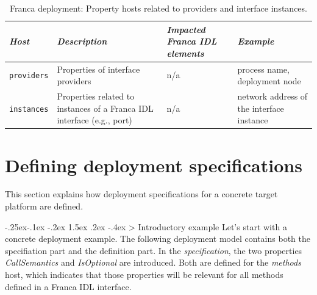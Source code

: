 \documentclass[a4paper,10pt]{scrreprt}
\makeatletter
\renewcommand\subsection{\medskip\@startsection{subsection}{2}{\z@}%
  {-.25ex\@plus -.1ex \@minus -.2ex}%
  {1.5ex \@plus .2ex \@minus -.4ex}%
  {\ifnum \scr@compatibility>\@nameuse{scr@v@2.96}\relax
    \setlength{\parfillskip}{\z@ plus 1fil}\fi
    \raggedsection\normalfont\sectfont\nobreak\size@subsection
  }%
}
\newlength{\XdocTEffectiveWidth}
\makeatother
\begin{document}
\begin{table}
\setlength{\XdocTEffectiveWidth}{\textwidth}
\addtolength{\XdocTEffectiveWidth}{-8.0\tabcolsep}
\noindent\begin{tabular}{p{0.13\XdocTEffectiveWidth}p{0.38\XdocTEffectiveWidth}p{0.25\XdocTEffectiveWidth}p{0.25\XdocTEffectiveWidth}}
\toprule
\textit{Host}

 & \textit{Description}

 & \textit{Impacted Franca IDL elements}

 & \textit{Example}

\\
\midrule
\protect\lstinline[language=FDeploy]�providers�

 & Properties of interface providers

 & n/a

 & process name, deployment node

\\
\protect\lstinline[language=FDeploy]�instances�

 & Properties related to instances of a Franca IDL interface (e.g., port)

 & n/a

 & network address of the interface instance

\\
\bottomrule
\end{tabular}
\caption{Franca deployment: Property hosts related to providers and interface instances.}
\label{DeploymentProviderHosts}
\end{table}

\section{Defining deployment specifications}
\label{DeploymentModels_Specifications}
This section explains how deployment specifications for a concrete target platform
are defined.

\subsection{Introductory example}
\label{DeploymentModels_Specifications_SimpleExample}
Let's start with a concrete deployment example. The following deployment model
contains both the specifiation part and the definition part.
In the \textit{specification}, the two properties \textit{CallSemantics} and \textit{IsOptional}
are introduced. Both are defined for the \textit{methods} host, which indicates that
those properties will be relevant for all methods defined in a Franca IDL interface. 
\end{document}
